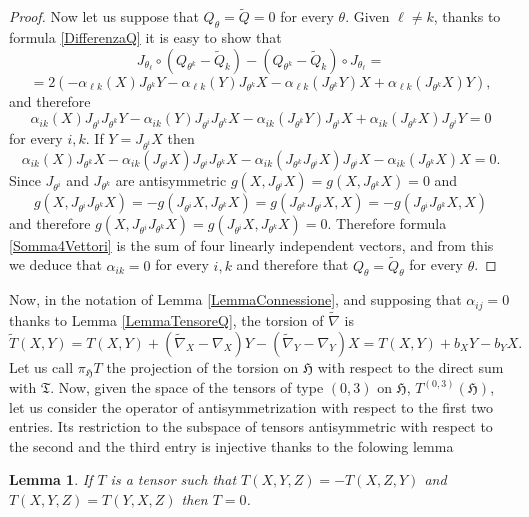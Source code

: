\documentclass{article}
\newcommand{\g}[1]{\mathfrak{#1}}
\newcommand{\alfa}{\alpha}
\newtheorem{lemma}[proposizione]{Lemma}
\theoremstyle{definition}
\theoremstyle{remark}
\begin{document}
\begin{proof}
 Now let us suppose that $Q_{\theta}=\widetilde{Q}=0$ for every $\theta$. Given $\ell\ne k$, thanks to formula \eqref{DifferenzaQ} it is easy to show that
 $$J_{\theta_{\ell}}\circ\left(Q_{\theta^k}-\widetilde{Q}_k\right) - \left(Q_{\theta^k}-\widetilde{Q}_k\right)\circ J_{\theta_{\ell}} = $$
 $$= 2\left(-\alfa_{\ell k}(X)J_{\theta^k}Y -\alfa_{\ell k}(Y)J_{\theta^k}X - \alfa_{\ell k}(J_{\theta^k}Y)X + \alfa_{\ell k}(J_{\theta^k}X)Y\right),$$
 and therefore
 $$\alfa_{ik}(X)J_{\theta^i}J_{\theta^k}Y-\alfa_{ik}(Y)J_{\theta^i}J_{\theta^k}X - \alfa_{ik}(J_{\theta^k}Y)J_{\theta^i}X + \alfa_{ik}(J_{\theta^k}X)J_{\theta^i}Y =0$$
 for every $i,k$. If $Y=J_{\theta^i}X$ then
 \begin{equation}\label{Somma4Vettori}
  \alfa_{ik}(X)J_{\theta^k}X-\alfa_{ik}(J_{\theta^i}X)J_{\theta^i}J_{\theta^k}X - \alfa_{ik}(J_{\theta^k}J_{\theta^i}X)J_{\theta^i}X - \alfa_{ik}(J_{\theta^k}X)X =0.
 \end{equation}
 Since $J_{\theta^i}$ and $J_{\theta^k}$ are antisymmetric $g(X,J_{\theta^i}X)=g(X,J_{\theta^k}X)=0$ and
 $$g(X,J_{\theta^i}J_{\theta^k}X) = -g(J_{\theta^i}X,J_{\theta^k}X) = g(J_{\theta^k}J_{\theta^i}X,X) = -g(J_{\theta^i}J_{\theta^k}X,X)$$
 and therefore $g(X,J_{\theta^i}J_{\theta^k}X)=g(J_{\theta^i}X,J_{\theta^k}X)=0$. Therefore formula \eqref{Somma4Vettori} is the sum of four linearly independent vectors, and from this we deduce that $\alfa_{ik}=0$ for every $i,k$ and therefore that $Q_{\theta}=\widetilde{Q}_{\theta}$ for every $\theta$.
\end{proof}

Now, in the notation of Lemma \ref{LemmaConnessione}, and supposing that $\alfa_{ij}=0$ thanks to Lemma \ref{LemmaTensoreQ}, the torsion of $\widetilde{\nabla}$ is
\begin{equation}\label{FormulaCambioTorsione}
 \widetilde{T}(X,Y) = T(X,Y) +(\widetilde{\nabla}_X-\nabla_X)Y -(\widetilde{\nabla}_Y-\nabla_Y)X= T(X,Y) +b_XY-b_YX.
\end{equation}
Let us call $\pi_{\g{H}}T$ the projection of the torsion on $\g{H}$ with respect to the direct sum with $\g{T}$.
Now, given the space of the tensors of type $(0,3)$ on $\g{H}$, $T^{(0,3)}(\g{H})$, let us consider the operator of antisymmetrization with respect to the first two entries.
Its restriction to the subspace of tensors antisymmetric with respect to the second and the third entry is injective thanks to the folowing lemma

\begin{lemma}
 If $T$ is a tensor such that $T(X,Y,Z)=-T(X,Z,Y)$ and\\ $T(X,Y,Z)=T(Y,X,Z)$ then $T=0$.
\end{lemma}
\end{document}
